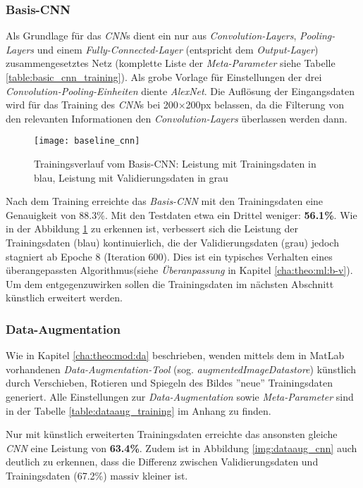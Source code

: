 \subsubsection{Basis-CNN}
Als Grundlage für das \textit{CNN}s dient ein nur aus \textit{Convolution-Layers}, \textit{Pooling-Layers} und einem \textit{Fully-Connected-Layer} (entspricht dem \textit{Output-Layer}) zusammengesetztes Netz (komplette Liste der \textit{Meta-Parameter} siehe Tabelle \ref{table:basic_cnn_training}). Als grobe Vorlage für Einstellungen der drei \textit{Convolution-Pooling-Einheiten} diente \textit{AlexNet}\cite{alexnet}. Die Auflösung der Eingangsdaten wird für das Training des \textit{CNN}s bei 200$\times$200px belassen, da die Filterung von den relevanten Informationen den \textit{Convolution-Layers} überlassen werden dann.

\begin{figure}[h]
	\centering
	\texttt{[image: baseline\_cnn]}
	\caption[\textit{\textit{Trainingsverlauf Basis-\textit{CNN}}}]{Trainingsverlauf vom Basis-{CNN}: Leistung mit Trainingsdaten in blau, Leistung mit Validierungsdaten in grau}
	\label{img:baseline_cnn}
\end{figure}

Nach dem Training erreichte das \textit{Basis-CNN} mit den Trainingsdaten eine Genauigkeit von 88.3\%. Mit den Testdaten etwa ein Drittel weniger: \textbf{56.1\%}. Wie in der Abbildung \ref{img:baseline_cnn} zu erkennen ist, verbessert sich die Leistung der Trainingsdaten (blau) kontinuierlich, die der Validierungsdaten (grau) jedoch stagniert ab Epoche 8 (Iteration 600). Dies ist ein typisches Verhalten eines überangepassten Algorithmus(siehe \textit{Überanpassung} in Kapitel \ref{cha:theo:ml:b-v}). Um dem entgegenzuwirken sollen die Trainingsdaten im nächsten Abschnitt künstlich erweitert werden.


\subsubsection{Data-Augmentation} \label{cha:met:da}
Wie in Kapitel \ref{cha:theo:mod:da} beschrieben, wenden mittels dem in MatLab vorhandenen \textit{Data-Augmentation-Tool} (sog. \textit{augmentedImageDatastore}) künstlich durch Verschieben, Rotieren und Spiegeln des Bildes ''neue'' Trainingsdaten generiert. Alle Einstellungen zur \textit{Data-Augmentation} sowie \textit{Meta-Parameter} sind in der Tabelle \ref{table:dataaug_training} im Anhang zu finden.

Nur mit künstlich erweiterten Trainingsdaten erreichte das ansonsten gleiche \textit{CNN} eine Leistung von \textbf{63.4\%}. Zudem ist in Abbildung \ref{img:dataaug_cnn} auch deutlich zu erkennen, dass die Differenz zwischen Validierungsdaten und Trainingsdaten (67.2\%) massiv kleiner ist.

